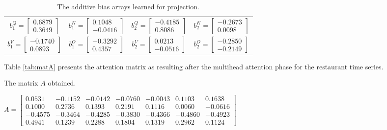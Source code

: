 \documentclass[algorithms,article,submit,pdftex,moreauthors]{Definitions/mdpi}
\begin{document}
\begin{table}
	\centering
	\caption{The additive bias arrays learned for projection.}
	\label{tab:bias}
	\begin{tabular}{c c c c}
		$b^{Q}_1 = \begin{bmatrix} 0.6879 \\ 0.3649 \end{bmatrix}$ 
		& $b^{K}_1 = \begin{bmatrix} 0.1048 \\ -0.0416 \end{bmatrix}$ 
		& $b^{Q}_2 = \begin{bmatrix}-0.4185 \\ 0.8086 \end{bmatrix}$ 
		& $b^{K}_2 = \begin{bmatrix} -0.2673 \\  0.0098 \end{bmatrix}$ \\
		$b^{V}_1 = \begin{bmatrix} -0.1740 \\  0.0893 \end{bmatrix}$ 
		& $b^{O}_1 = \begin{bmatrix} -0.3292 \\  0.4357 \end{bmatrix}$ 
		& $b^{V}_2 = \begin{bmatrix} 0.0213 \\ -0.0516 \end{bmatrix}$ 
		& $b^{O}_2 = \begin{bmatrix} -0.2850 \\ -0.2149 \end{bmatrix}$ \\
	\end{tabular}
\end{table}

\noindent Table \ref{tab:matA} presents the attention matrix as resulting after the multihead attention phase for the restaurant time series.

\begin{table}[ht]
	\centering
	\caption{The matrix $A$ obtained.}
	\label{tab:matA}
	$
	A = 
\begin{bmatrix}
 0.0531 & -0.1152 & -0.0142 & -0.0760 & -0.0043 &  0.1103 &  0.1638 \\
 0.1000 &  0.2736 &  0.1393 &  0.2191 &  0.1116 &  0.0060 & -0.0616 \\
-0.4575 & -0.3464 & -0.4285 & -0.3830 & -0.4366 & -0.4860 & -0.4923 \\
 0.4941 &  0.1239 &  0.2288 &  0.1804 &  0.1319 &  0.2962 &  0.1124
\end{bmatrix}
	$
\end{table}
\end{document}
